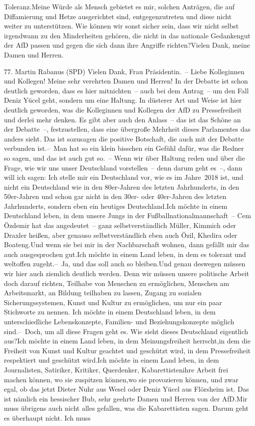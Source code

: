 \documentclass{article}
\begin{document}
Toleranz.Meine Würde als Mensch gebietet es mir, solchen Anträgen, die auf Diffamierung und Hetze ausgerichtet sind, entgegenzutreten und diese nicht weiter zu unterstützen. Wie können wir sonst sicher sein, dass wir nicht selbst irgendwann zu den Minderheiten gehören, die nicht in das nationale Gedankengut der AfD passen und gegen die sich dann ihre Angriffe richten?Vielen Dank, meine Damen und Herren.




	77. Martin Rabanus (SPD) Vielen Dank, Frau Präsidentin. – Liebe Kolleginnen und Kollegen! Meine sehr verehrten Damen und Herren! In der Debatte ist schon deutlich geworden, dass es hier mitnichten – auch bei dem Antrag – um den Fall Deniz Yücel geht, sondern um eine Haltung. In düsterer Art und Weise ist hier deutlich geworden, was die Kolleginnen und Kollegen der AfD zu Pressefreiheit und derlei mehr denken. Es gibt aber auch den Anlass – das ist das Schöne an der Debatte –, festzustellen, dass eine übergroße Mehrheit dieses Parlamentes das anders sieht. Das ist sozusagen die positive Botschaft, die auch mit der Debatte verbunden ist.– Man hat so ein klein bisschen ein Gefühl dafür, was die Redner so sagen, und das ist auch gut so. – Wenn wir über Haltung reden und über die Frage, wie wir uns unser Deutschland vorstellen – denn darum geht es –, dann will ich sagen: Ich stelle mir ein Deutschland vor, wie es im Jahre 2018 ist, und nicht ein Deutschland wie in den 80er-Jahren des letzten Jahrhunderts, in den 50er-Jahren und schon gar nicht in den 30er- oder 40er-Jahren des letzten Jahrhunderts, sondern eben ein heutiges Deutschland.Ich möchte in einem Deutschland leben, in dem unsere Jungs in der Fußballnationalmannschaft – Cem Özdemir hat das angedeutet – ganz selbstverständlich Müller, Kimmich oder Draxler heißen, aber genauso selbstverständlich eben auch Özil, Khedira oder Boateng.Und wenn sie bei mir in der Nachbarschaft wohnen, dann gefällt mir das auch ausgesprochen gut.Ich möchte in einem Land leben, in dem es tolerant und weltoffen zugeht.– Ja, und das soll auch so bleiben.Und genau deswegen müssen wir hier auch ziemlich deutlich werden. Denn wir müssen unsere politische Arbeit doch darauf richten, Teilhabe von Menschen zu ermöglichen, Menschen am Arbeitsmarkt, an Bildung teilhaben zu lassen, Zugang zu sozialen Sicherungssystemen, Kunst und Kultur zu ermöglichen, um nur ein paar Stichworte zu nennen. Ich möchte in einem Deutschland leben, in dem unterschiedliche Lebenskonzepte, Familien- und Beziehungskonzepte möglich sind.– Doch, um all diese Fragen geht es. Wie sieht dieses Deutschland eigentlich aus?Ich möchte in einem Land leben, in dem Meinungsfreiheit herrscht,in dem die Freiheit von Kunst und Kultur geachtet und geschützt wird, in dem Pressefreiheit respektiert und geschützt wird.Ich möchte in einem Land leben, in dem Journalisten, Satiriker, Kritiker, Querdenker, Kabarettistenihre Arbeit frei machen können, wo sie zuspitzen können,wo sie provozieren können, und zwar egal, ob das jetzt Dieter Nuhr aus Wesel oder Deniz Yücel aus Flörsheim ist. Das ist nämlich ein hessischer Bub, sehr geehrte Damen und Herren von der AfD.Mir muss übrigens auch nicht alles gefallen, was die Kabarettisten sagen. Darum geht es überhaupt nicht. Ich muss 
\end{document}
